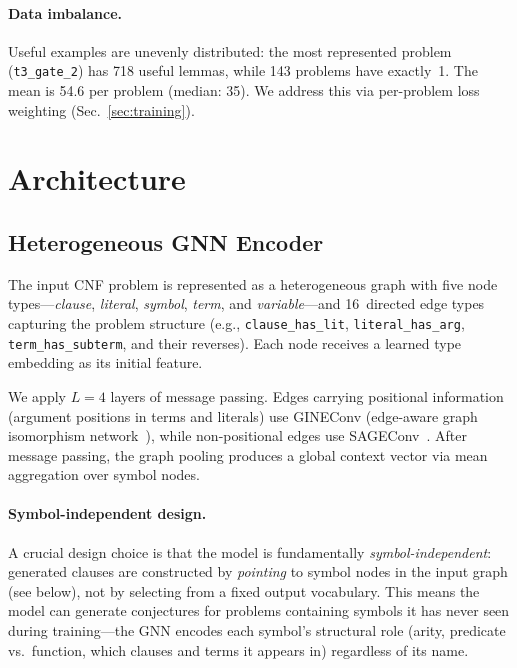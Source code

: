 \documentclass{easychair}
\begin{document}
\paragraph{Data imbalance.}
Useful examples are unevenly distributed: the most represented
problem (\texttt{t3\_gate\_2}) has 718 useful lemmas, while 143
problems have exactly~1.  The mean is 54.6 per problem (median: 35).
We address this via per-problem loss weighting
(Sec.~\ref{sec:training}).


\section{Architecture}
\label{sec:arch}

\subsection{Heterogeneous GNN Encoder}

The input CNF problem is represented as a heterogeneous graph with
five node types---\emph{clause}, \emph{literal}, \emph{symbol},
\emph{term}, and \emph{variable}---and 16~directed edge types
capturing the problem structure (e.g., \texttt{clause\_has\_lit},
\texttt{literal\_has\_arg}, \texttt{term\_has\_subterm}, and their
reverses).  Each node receives a learned type embedding as its initial
feature.

We apply $L=4$ layers of message passing.  Edges carrying positional
information (argument positions in terms and literals) use GINEConv
(edge-aware graph isomorphism network~\cite{Hu2020}), while
non-positional edges use SAGEConv~\cite{Hamilton2017}.  After message
passing, the graph pooling produces a global context vector via mean
aggregation over symbol nodes.

\paragraph{Symbol-independent design.}
A crucial design choice is that the model is fundamentally
\emph{symbol-independent}: generated clauses are constructed by
\emph{pointing} to symbol nodes in the input graph (see below), not
by selecting from a fixed output vocabulary.  This means the model can
generate conjectures for problems containing symbols it has never seen
during training---the GNN encodes each symbol's structural role
(arity, predicate vs.\ function, which clauses and terms it appears
in) regardless of its name.
\end{document}
